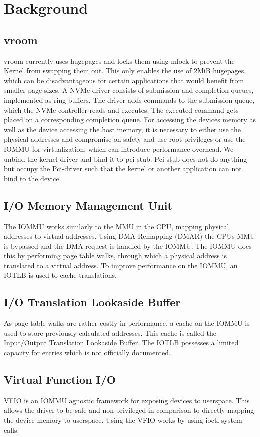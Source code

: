 \chapter{Background}

\section{vroom}
vroom currently uses hugepages and locks them using mlock to prevent the Kernel from swapping them out.
This only enables the use of 2MiB hugepages, which can be disadvantageous for certain applications that would benefit from smaller page sizes.
A NVMe driver consists of submission and completion queues, implemented as ring buffers.
The driver adds commands to the submission queue, which the NVMe controller reads and executes.
The executed command gets placed on a corresponding completion queue.
For accessing the devices memory as well as the device accessing the host memory, it is necessary to either use the physical addresses and compromise on safety and use root privileges or use the IOMMU for virtualization, which can introduce performance overhead.
We unbind the kernel driver and bind it to pci-stub. Pci-stub does not do anything but occupy the Pci-driver such that the kernel or another application can not bind to the device.

\section{I/O Memory Management Unit}
The IOMMU works similarly to the MMU in the CPU, mapping physical addresses to virtual addresses.
Using DMA Remapping (DMAR) the CPUs MMU is bypassed and the DMA request is handled by the IOMMU.
The IOMMU does this by performing page table walks, through which a physical address is translated to a virtual address.
To improve performance on the IOMMU, an IOTLB is used to cache translations.

\section{I/O Translation Lookaside Buffer}
As page table walks are rather costly in performance, a cache on the IOMMU is used to store previously calculated addresses. This cache is called the Input/Output Translation Lookaside Buffer. The IOTLB possesses a limited capacity for entries which is not officially documented.

\section{Virtual Function I/O}
VFIO is an IOMMU agnostic framework for exposing devices to userspace.
This allows the driver to be safe and non-privileged in comparison to directly mapping the device memory to userspace.
Using the VFIO works by using ioctl system calls.

